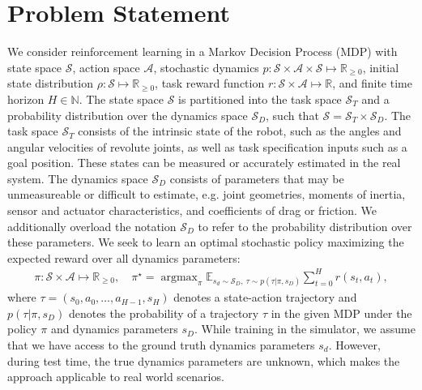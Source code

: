 \documentclass{article}
\newcommand{\R}{\mathbb{R}}
\newcommand{\E}{\mathbb{E}}
\newcommand{\cA}{\mathcal{A}}
\newcommand{\cS}{\mathcal{S}}
\DeclareMathOperator*{\argmax}{argmax}
\newcommand{\sysid}{dynamics}
\begin{document}
\section{Problem Statement}

We consider reinforcement learning in a Markov Decision Process (MDP)
with state space $\cS$,
action space $\cA$,
stochastic dynamics $p : \cS \times \cA \times \cS \mapsto \R_{\geq 0}$,
initial state distribution $\rho : \cS \mapsto \R_{\geq 0}$,
task reward function $r : \cS \times \cA \mapsto \R$,
and finite time horizon $H \in \mathbb{N}$.
The state space $\cS$ is partitioned into
the task space $\cS_T$
and a probability distribution over the dynamics space $\cS_D$, such that $\cS = \cS_T \times \cS_D$.
The task space $\cS_T$ consists of the intrinsic state of the robot, such as the angles and angular velocities of revolute joints,
as well as task specification inputs such as a goal position.
These states can be measured or accurately estimated in the real system.
The \sysid{} space $\cS_D$ consists of parameters that may be unmeasureable or difficult to estimate, e.g. joint geometries, moments of inertia, sensor and actuator characteristics, and coefficients of drag or friction.
We additionally overload the notation $\cS_D$ to refer to the probability distribution over these parameters.
We seek to learn an optimal stochastic policy maximizing the expected reward over all \sysid{} parameters:
\begin{equation}\begin{split}
\pi : \cS \times \cA \mapsto \R_{\geq 0}, \quad
\pi^\star = \argmax_\pi \E_{s_d \sim \cS_D,\ \tau \sim p(\tau|\pi,s_D)} \sum_{t = 0}^H
r(s_t, a_t),
\label{objective}
\end{split}\end{equation}
where $\tau = (s_0, a_0, \dots, a_{H-1}, s_H)$ denotes a state-action trajectory
and $p(\tau | \pi, s_D)$ denotes the probability of a trajectory $\tau$ in the given MDP under the policy $\pi$
and \sysid{} parameters $s_D$.
While training in the simulator, we assume that we have access to the ground truth \sysid{} parameters $s_d$.
However, during test time, the true \sysid{} parameters are unknown, which makes the approach applicable to real world scenarios.
\end{document}
